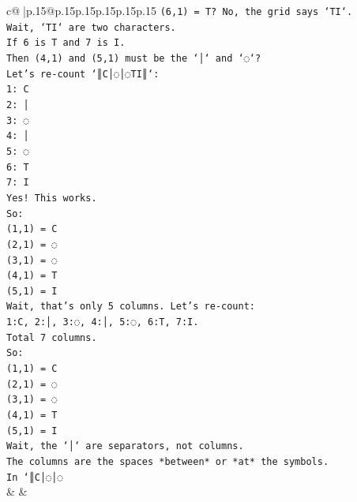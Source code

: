 \documentclass{article}
\begin{document}
{\begin{supertabular}{c@{$\;$}|p{.15\linewidth}@{}p{.15\linewidth}p{.15\linewidth}p{.15\linewidth}p{.15\linewidth}p{.15\linewidth}}
{{{\texttt{(6,1) = T? No, the grid says `TI`.} \\
\texttt{Wait, `TI` are two characters.} \\
\texttt{If 6 is T and 7 is I.} \\
\texttt{Then (4,1) and (5,1) must be the `│` and `◌`?} \\
\texttt{Let's re{-}count `║C│◌│◌TI║`:} \\
\texttt{1: C} \\
\texttt{2: │} \\
\texttt{3: ◌} \\
\texttt{4: │} \\
\texttt{5: ◌} \\
\texttt{6: T} \\
\texttt{7: I} \\
\texttt{Yes! This works.} \\
\texttt{So:} \\
\texttt{(1,1) = C} \\
\texttt{(2,1) = ◌} \\
\texttt{(3,1) = ◌} \\
\texttt{(4,1) = T} \\
\texttt{(5,1) = I} \\
\texttt{Wait, that's only 5 columns. Let's re{-}count:} \\
\texttt{1:C, 2:│, 3:◌, 4:│, 5:◌, 6:T, 7:I.} \\
\texttt{Total 7 columns.} \\
\texttt{So:} \\
\texttt{(1,1) = C} \\
\texttt{(2,1) = ◌} \\
\texttt{(3,1) = ◌} \\
\texttt{(4,1) = T} \\
\texttt{(5,1) = I} \\
\texttt{Wait, the `│` are separators, not columns.} \\
\texttt{The columns are the spaces *between* or *at* the symbols.} \\
\texttt{In `║C│◌│◌} \\
            }
        }
    }
    & & \\ \\


\end{supertabular}}
\end{document}

